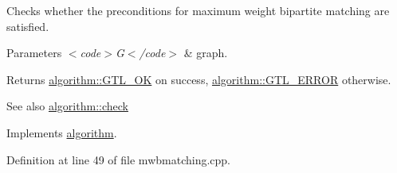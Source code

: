 Checks whether the preconditions for maximum weight bipartite matching are satisfied.


\begin{DoxyParams}{Parameters}
{\em $<$code$>$\+G$<$/code$>$} & graph. \\
\hline
\end{DoxyParams}
\begin{DoxyReturn}{Returns}
{\ttfamily \mbox{\hyperlink{classalgorithm_af1a0078e153aa99c24f9bdf0d97f6710a5114c20e4a96a76b5de9f28bf15e282b}{algorithm\+::\+G\+T\+L\+\_\+\+OK}}} on success, {\ttfamily \mbox{\hyperlink{classalgorithm_af1a0078e153aa99c24f9bdf0d97f6710a6fcf574690bbd6cf710837a169510dd7}{algorithm\+::\+G\+T\+L\+\_\+\+E\+R\+R\+OR}}} otherwise. 
\end{DoxyReturn}
\begin{DoxySeeAlso}{See also}
\mbox{\hyperlink{classalgorithm_a76361fb03ad1cf643affc51821e43bed}{algorithm\+::check}} 
\end{DoxySeeAlso}


Implements \mbox{\hyperlink{classalgorithm_a76361fb03ad1cf643affc51821e43bed}{algorithm}}.



Definition at line 49 of file mwbmatching.\+cpp.



